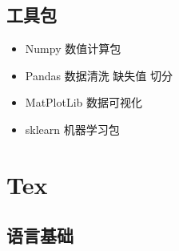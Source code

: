 \documentclass[]{book}
\providecommand{\tightlist}{%
  \setlength{\itemsep}{0pt}\setlength{\parskip}{0pt}}
\begin{document}
\hypertarget{ux5de5ux5177ux5305}{%
\subsection{工具包}\label{ux5de5ux5177ux5305}}

\begin{itemize}
\tightlist
\item
  Numpy 数值计算包
\item
  Pandas 数据清洗 缺失值 切分
\item
  MatPlotLib 数据可视化
\item
  sklearn 机器学习包
\end{itemize}

\hypertarget{tex}{%
\section{Tex}\label{tex}}

\hypertarget{ux8bedux8a00ux57faux7840}{%
\subsection{语言基础}\label{ux8bedux8a00ux57faux7840}}
\end{document}
